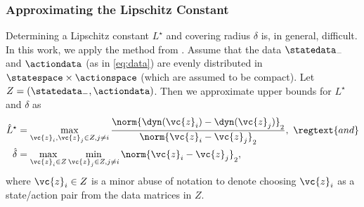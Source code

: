 










\subsubsection{Approximating the Lipschitz Constant}

Determining a Lipschitz constant $L^\star$ and covering radius $\delta$ is, in general, difficult.
In this work, we apply the method from \cite[Remark 9]{alanwar2020data}.
Assume that the data $\statedata_-$ and $\actiondata$ (as in \eqref{eq:data}) are evenly distributed in $\statespace\times\actionspace$ (which are assumed to be compact).
Let $Z = (\statedata_-, \actiondata)$.
Then we approximate upper bounds for $L^\star$ and $\delta$ as
\begin{align}
    \hat{L}^\star &= \max_{\vc{z}_i, \vc{z}_j \in Z, j \neq i} \frac{\norm{\dyn(\vc{z}_i) - \dyn(\vc{z}_j)}_2}{\norm{\vc{z}_i - \vc{z}_j}_2},\ \regtext{and} \\
    \hat{\delta} &= \max_{\vc{z}_i \in Z} \min_{\vc{z}_j \in Z, j \neq i} \norm{\vc{z}_i - \vc{z}_j}_2,
\end{align}
where $\vc{z}_i \in Z$ is a minor abuse of notation to denote choosing $\vc{z}_i$ as a state/action pair from the data matrices in $Z$.



